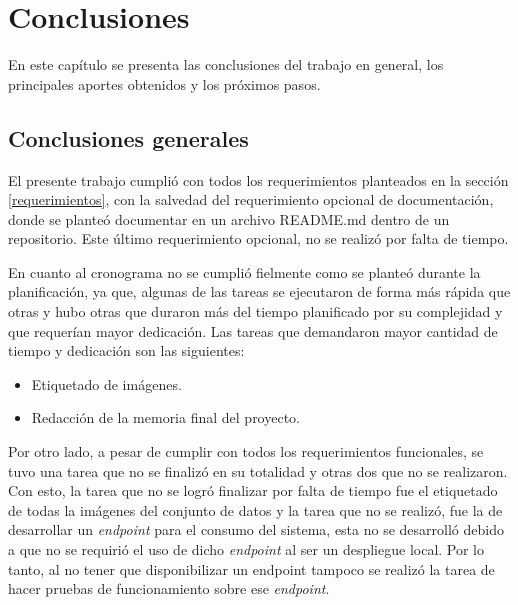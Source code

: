 
\chapter{Conclusiones} %

\label{Chapter5} %




En este capítulo se presenta las conclusiones del trabajo en general, los principales aportes obtenidos y los próximos pasos.

\section{Conclusiones generales }

El presente trabajo cumplió con todos los requerimientos planteados en la sección \ref{requerimientos}, con la salvedad del requerimiento opcional de documentación, donde se planteó documentar en un archivo README.md dentro de un repositorio. Este último requerimiento opcional, no se realizó por falta de tiempo.

En cuanto al cronograma no se cumplió fielmente como se planteó durante la planificación, ya que, algunas de las tareas se ejecutaron de forma más rápida que otras y hubo otras que duraron más del tiempo planificado por su complejidad y que requerían mayor dedicación. Las tareas que demandaron mayor cantidad de tiempo y dedicación son las siguientes:

\begin{itemize}
\item Etiquetado de imágenes.
\item Redacción de la memoria final del proyecto. 
\end{itemize}

Por otro lado, a pesar de cumplir con todos los requerimientos funcionales, se tuvo una tarea que no se finalizó en su totalidad y otras dos que no se realizaron. Con esto, la tarea que no se logró finalizar por falta de tiempo fue el etiquetado de todas la imágenes del conjunto de datos y la tarea que no se realizó, fue la de desarrollar un \textit{endpoint} para el consumo del sistema, esta no se desarrolló debido a que no se requirió el uso de dicho \textit{endpoint} al ser un despliegue local. Por lo tanto, al no tener que disponibilizar un endpoint tampoco se realizó la tarea de hacer pruebas de funcionamiento sobre ese \textit{endpoint}.

